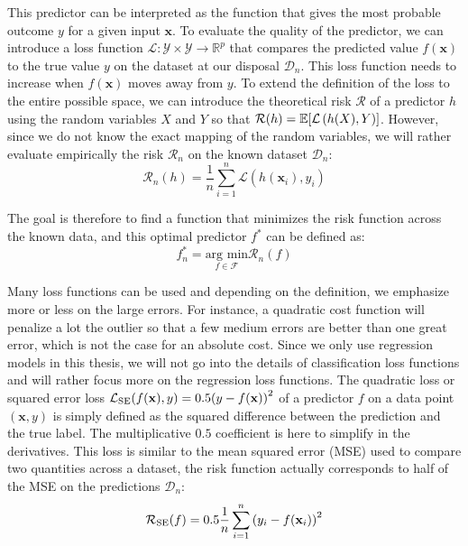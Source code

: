 \documentclass[main]{subfiles}
\begin{document}
This predictor can be interpreted as the function that gives the most probable outcome $y$ for a given input $\mathbf{x}$. To evaluate the quality of the predictor, we can introduce a loss function $\mathcal{L}:\mathcal{Y}\times\mathcal{Y} \rightarrow \mathbb{R}^{p}$ that compares the predicted value $f(\mathbf{x})$ to the true value $y$ on the dataset at our disposal $\mathcal{D}_{n}$. This loss function needs to increase when $f(\mathbf{x})$ moves away from $y$. To extend the definition of the loss to the entire possible space, we can introduce the theoretical risk $\mathcal{R}$ of a predictor $h$ using the random variables $X$ and $Y$ so that $\mathcal{R}(h) = \mathbb{E}{\left[\mathcal{L}\left(h(X),Y\right)\right]}$. However, since we do not know the exact mapping of the random variables, we will rather evaluate empirically the risk $\mathcal{R}_n$ on the known dataset $\mathcal{D}_{n}$:
\begin{equation}\label{eq:risk}
  \mathcal{R}_n(h) = \frac{1}{n}\sum_{i=1}^n \mathcal{L}\left(h(\mathbf{x}_i),y_i\right)
\end{equation}

The goal is therefore to find a function that minimizes the risk function across the known data, and this optimal predictor $f^*$ can be defined as:
\begin{equation}\label{eq:min_f}
  f_n^* = \underset{f\in\mathcal{F}}{\text{arg min}} \mathcal{R}_n(f)
\end{equation}


Many loss functions can be used and depending on the definition, we emphasize more or less on the large errors. For instance, a quadratic cost function will penalize a lot the outlier so that a few medium errors are better than one great error, which is not the case for an absolute cost. Since we only use regression models in this thesis, we will not go into the details of classification loss functions and will rather focus more on the regression loss functions. The quadratic loss or squared error loss $\mathcal{L}_{\text{SE}}(f(\mathbf{x}),y)=0.5{\left(y-f(\mathbf{x})\right)}^2$ of a predictor $f$ on a data point $(\mathbf{x},y)$ is simply defined as the squared difference between the prediction and the true label. The multiplicative $0.5$ coefficient is here to simplify in the derivatives. This loss is similar to the mean squared error (MSE) used to compare two quantities across a dataset, the risk function actually corresponds to half of the MSE on the predictions $\mathcal{D}_n$:
\begin{equation}
  \mathcal{R}_{\text{SE}}(f) = 0.5\frac{1}{n}\sum_{i=1}^n {\left(y_i-f(\mathbf{x}_i)\right)}^2
\end{equation}
\end{document}
